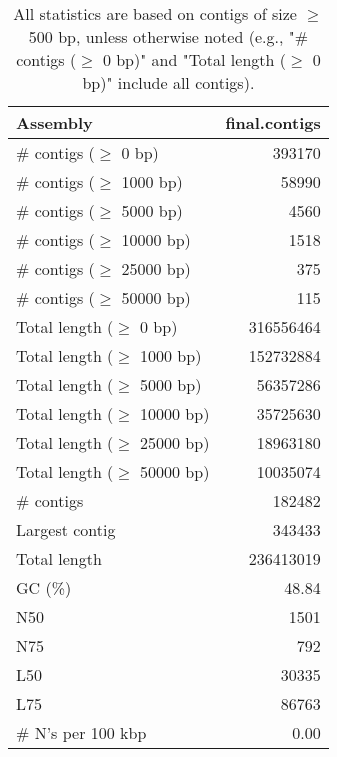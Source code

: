 \documentclass[12pt,a4paper]{article}
\begin{document}
\begin{table}[ht]
\begin{center}
\caption{All statistics are based on contigs of size $\geq$ 500 bp, unless otherwise noted (e.g., "\# contigs ($\geq$ 0 bp)" and "Total length ($\geq$ 0 bp)" include all contigs).}
\begin{tabular}{|l*{1}{|r}|}
\hline
Assembly & final.contigs \\ \hline
\# contigs ($\geq$ 0 bp) & 393170 \\ \hline
\# contigs ($\geq$ 1000 bp) & 58990 \\ \hline
\# contigs ($\geq$ 5000 bp) & 4560 \\ \hline
\# contigs ($\geq$ 10000 bp) & 1518 \\ \hline
\# contigs ($\geq$ 25000 bp) & 375 \\ \hline
\# contigs ($\geq$ 50000 bp) & 115 \\ \hline
Total length ($\geq$ 0 bp) & 316556464 \\ \hline
Total length ($\geq$ 1000 bp) & 152732884 \\ \hline
Total length ($\geq$ 5000 bp) & 56357286 \\ \hline
Total length ($\geq$ 10000 bp) & 35725630 \\ \hline
Total length ($\geq$ 25000 bp) & 18963180 \\ \hline
Total length ($\geq$ 50000 bp) & 10035074 \\ \hline
\# contigs & 182482 \\ \hline
Largest contig & 343433 \\ \hline
Total length & 236413019 \\ \hline
GC (\%) & 48.84 \\ \hline
N50 & 1501 \\ \hline
N75 & 792 \\ \hline
L50 & 30335 \\ \hline
L75 & 86763 \\ \hline
\# N's per 100 kbp & 0.00 \\ \hline
\end{tabular}
\end{center}
\end{table}
\end{document}
